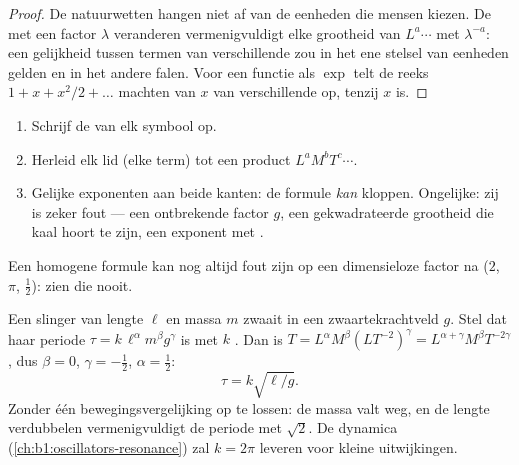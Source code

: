 \begin{proof}
De natuurwetten hangen niet af van de eenheden die mensen kiezen. De
 met een factor $\lambda$ veranderen vermenigvuldigt elke
grootheid van  $L^a \cdots$ met $\lambda^{-a}$: een gelijkheid tussen
termen van verschillende  zou in het ene stelsel van eenheden gelden
en in het andere falen. Voor een functie als $\exp$ telt de reeks
$1 + x + x^2/2 + \dots$ machten van $x$ van verschillende  op,
tenzij $x$  is.
\end{proof}

\begin{method}\label{met:b1:units-dimensions:check}
\begin{enumerate}
  \item Schrijf de  van elk symbool op.
  \item Herleid elk lid (elke term) tot een product $L^a M^b T^c \cdots$.
  \item Gelijke exponenten aan beide kanten: de formule \emph{kan} kloppen.
        Ongelijke: zij is zeker fout --- een ontbrekende factor $g$, een
        gekwadrateerde grootheid die kaal hoort te zijn, een exponent met
        .
\end{enumerate}
Een homogene formule kan nog altijd fout zijn op een dimensieloze factor na
($2$, $\pi$, $\tfrac12$):  zien die nooit.
\end{method}

\begin{example}\label{ex:b1:units-dimensions:pendulum}
Een slinger van lengte $\ell$ en massa $m$ zwaait in een zwaartekrachtveld
$g$. Stel dat haar periode $\tau = k\,\ell^\alpha m^\beta g^\gamma$ is met $k$
. Dan is $T = L^\alpha M^\beta (L T^{-2})^\gamma =
L^{\alpha+\gamma} M^\beta T^{-2\gamma}$, dus $\beta = 0$,
$\gamma = -\tfrac12$, $\alpha = \tfrac12$:
\[
\tau = k\sqrt{\ell/g} .
\]
Zonder één bewegingsvergelijking op te lossen: de massa valt weg, en de lengte
verdubbelen vermenigvuldigt de periode met $\sqrt2$. De dynamica
(\cref{ch:b1:oscillators-resonance}) zal $k = 2\pi$ leveren voor kleine
uitwijkingen.
\end{example}

